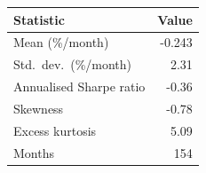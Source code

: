 \begin{tabular}{lr}
\toprule
Statistic & Value \\
\midrule
Mean (\%/month) & -0.243 \\
Std.\ dev.\ (\%/month) & 2.31 \\
Annualised Sharpe ratio & -0.36 \\
Skewness & -0.78 \\
Excess kurtosis & 5.09 \\
Months & 154 \\
\bottomrule
\end{tabular}